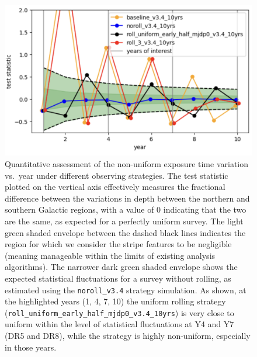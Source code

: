 
\begin{figure}
    \centering
    \includegraphics[width=0.7\linewidth]{figures/stripiness_metric.png}
    \caption{
    Quantitative assessment of the non-uniform exposure time variation vs.\ year under different observing strategies.  The test statistic plotted on the vertical axis effectively measures the fractional difference between the variations in depth between the northern and southern Galactic regions, with a value of 0 indicating that the two are the same, as expected for a perfectly uniform survey.  The light green shaded envelope between the dashed black lines indicates the region for which we consider the stripe features to be negligible (meaning manageable within the limits of existing analysis algorithms).   The narrower dark green shaded envelope shows the expected statistical fluctuations for a survey without rolling, as estimated using the \texttt{noroll\_v3.4} strategy simulation.  As shown, at the highlighted years (1, 4, 7, 10) the uniform rolling strategy (\texttt{roll\_uniform\_early\_half\_mjdp0\_v3.4\_10yrs}) is very close to uniform within the level of statistical fluctuations at Y4 and Y7 (DR5 and DR8), while the  strategy is highly non-uniform, especially in those years.
}
    \label{fig:stripiness}
\end{figure}

